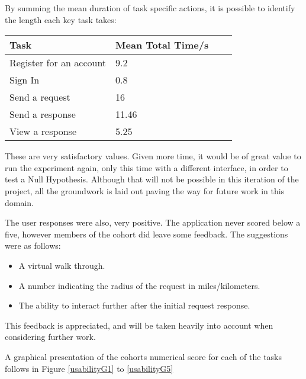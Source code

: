 \documentclass[a4paper]{article}
\begin{document}
By summing the mean duration of task specific actions, it is possible to identify the length each key task takes:

\begin{table}[H]
\centering
    \begin{tabular}{llll}
    Task                      & Mean Total Time/s\\ \hline
    Register for an account    & 9.2  \\      
    Sign In & 0.8       \\
    Send a request& 16 \\
    Send a response& 11.46 \\
    View a response & 5.25\\
 
    \end{tabular}
\end{table}

These are very satisfactory values. Given more time, it would be of great value to run the experiment again, only this time with a different interface, in order to test a Null Hypothesis. Although that will not be possible in this iteration of the project, all the groundwork is laid out paving the way for future work in this domain.

The user responses were also, very positive. The application never scored below a five, however members of the cohort did leave some feedback. The suggestions were as follows:

\begin{itemize}
\item A virtual walk through.
\item A number indicating the radius of the request in miles/kilometers.
\item The ability to interact further after the initial request response.
\end{itemize}

This feedback is appreciated, and will be taken heavily into account when considering further work.

A graphical presentation of the cohorts numerical score for each of the tasks follows in Figure \ref{usabilityG1} to \ref{usabilityG5}
\end{document}
